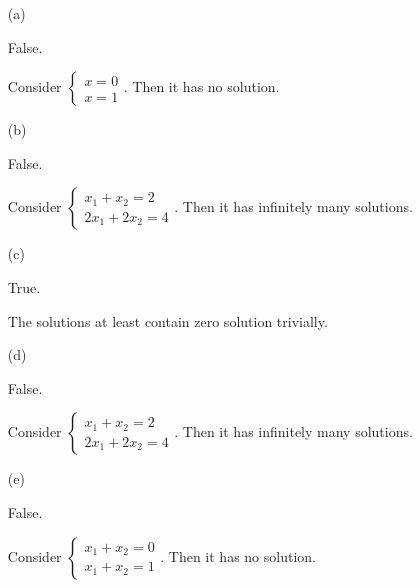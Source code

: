 \begin{Exercise}
\begin{enumerate}[(a)]
\item[(a)]
\begin{answer}
False.
\end{answer}
\begin{solution}
Consider $\begin{cases}
x = 0 \\
x = 1
\end{cases}$. Then it has no solution.
\end{solution}

\item[(b)]
\begin{answer}
False.
\end{answer}
\begin{solution}
Consider $\begin{cases}
x_1 + x_2 = 2 \\
2x_1 + 2x_2 = 4
\end{cases}$. Then it has infinitely many solutions.
\end{solution}

\item[(c)]
\begin{answer}
True.
\end{answer}
\begin{solution}
The solutions at least contain zero solution trivially.
\end{solution}

\item[(d)]
\begin{answer}
False.
\end{answer}
\begin{solution}
Consider $\begin{cases}
x_1 + x_2 = 2 \\
2x_1 + 2x_2 = 4
\end{cases}$. Then it has infinitely many solutions.
\end{solution}

\item[(e)]
\begin{answer}
False.
\end{answer}
\begin{solution}
Consider $\begin{cases}
x_1 + x_2 = 0 \\
x_1 + x_2 = 1
\end{cases}$. Then it has no solution.
\end{solution}


\end{enumerate}
\end{Exercise}
